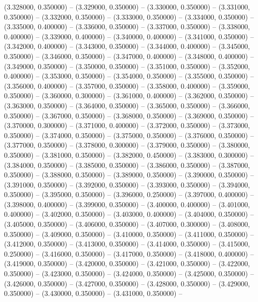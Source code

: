 (3.328000, 0.350000) -- 
(3.329000, 0.350000) -- 
(3.330000, 0.350000) -- 
(3.331000, 0.350000) -- 
(3.332000, 0.350000) -- 
(3.333000, 0.350000) -- 
(3.334000, 0.350000) -- 
(3.335000, 0.400000) -- 
(3.336000, 0.350000) -- 
(3.337000, 0.350000) -- 
(3.338000, 0.400000) -- 
(3.339000, 0.400000) -- 
(3.340000, 0.400000) -- 
(3.341000, 0.350000) -- 
(3.342000, 0.400000) -- 
(3.343000, 0.350000) -- 
(3.344000, 0.400000) -- 
(3.345000, 0.350000) -- 
(3.346000, 0.350000) -- 
(3.347000, 0.400000) -- 
(3.348000, 0.400000) -- 
(3.349000, 0.350000) -- 
(3.350000, 0.350000) -- 
(3.351000, 0.350000) -- 
(3.352000, 0.400000) -- 
(3.353000, 0.350000) -- 
(3.354000, 0.350000) -- 
(3.355000, 0.350000) -- 
(3.356000, 0.400000) -- 
(3.357000, 0.350000) -- 
(3.358000, 0.400000) -- 
(3.359000, 0.350000) -- 
(3.360000, 0.300000) -- 
(3.361000, 0.400000) -- 
(3.362000, 0.350000) -- 
(3.363000, 0.350000) -- 
(3.364000, 0.350000) -- 
(3.365000, 0.350000) -- 
(3.366000, 0.350000) -- 
(3.367000, 0.350000) -- 
(3.368000, 0.350000) -- 
(3.369000, 0.350000) -- 
(3.370000, 0.300000) -- 
(3.371000, 0.400000) -- 
(3.372000, 0.350000) -- 
(3.373000, 0.350000) -- 
(3.374000, 0.350000) -- 
(3.375000, 0.350000) -- 
(3.376000, 0.350000) -- 
(3.377000, 0.350000) -- 
(3.378000, 0.300000) -- 
(3.379000, 0.350000) -- 
(3.380000, 0.350000) -- 
(3.381000, 0.350000) -- 
(3.382000, 0.450000) -- 
(3.383000, 0.300000) -- 
(3.384000, 0.350000) -- 
(3.385000, 0.350000) -- 
(3.386000, 0.350000) -- 
(3.387000, 0.350000) -- 
(3.388000, 0.350000) -- 
(3.389000, 0.350000) -- 
(3.390000, 0.350000) -- 
(3.391000, 0.350000) -- 
(3.392000, 0.350000) -- 
(3.393000, 0.350000) -- 
(3.394000, 0.350000) -- 
(3.395000, 0.350000) -- 
(3.396000, 0.250000) -- 
(3.397000, 0.400000) -- 
(3.398000, 0.400000) -- 
(3.399000, 0.350000) -- 
(3.400000, 0.400000) -- 
(3.401000, 0.400000) -- 
(3.402000, 0.350000) -- 
(3.403000, 0.400000) -- 
(3.404000, 0.350000) -- 
(3.405000, 0.350000) -- 
(3.406000, 0.350000) -- 
(3.407000, 0.300000) -- 
(3.408000, 0.350000) -- 
(3.409000, 0.350000) -- 
(3.410000, 0.350000) -- 
(3.411000, 0.350000) -- 
(3.412000, 0.350000) -- 
(3.413000, 0.350000) -- 
(3.414000, 0.350000) -- 
(3.415000, 0.250000) -- 
(3.416000, 0.350000) -- 
(3.417000, 0.350000) -- 
(3.418000, 0.400000) -- 
(3.419000, 0.350000) -- 
(3.420000, 0.350000) -- 
(3.421000, 0.350000) -- 
(3.422000, 0.350000) -- 
(3.423000, 0.350000) -- 
(3.424000, 0.350000) -- 
(3.425000, 0.350000) -- 
(3.426000, 0.350000) -- 
(3.427000, 0.350000) -- 
(3.428000, 0.350000) -- 
(3.429000, 0.350000) -- 
(3.430000, 0.350000) -- 
(3.431000, 0.350000) -- 
